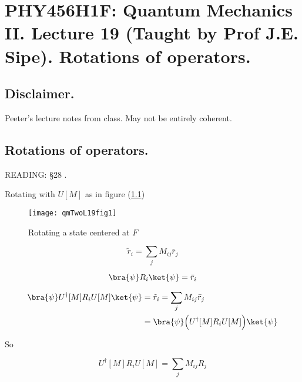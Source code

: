 
%

\chapter{PHY456H1F: Quantum Mechanics II.  Lecture 19 (Taught by Prof J.E. Sipe).  Rotations of operators.}
\label{chap:qmTwoL19}
{}
\date{Nov 16, 2011}

\beginArtWithToc

\section{Disclaimer.}

Peeter's lecture notes from class.  May not be entirely coherent.

\section{Rotations of operators.}

READING: \S 28 \cite{desai2009quantum}.

Rotating with $U[M]$ as in figure (\ref{fig:qmTwoL19:qmTwoL19fig1})
\begin{figure}[htp]
   \centering
   \texttt{[image: qmTwoL19fig1]}
   \caption{Rotating a state centered at $F$}\label{fig:qmTwoL19:qmTwoL19fig1}
\end{figure}

\begin{equation}\label{eqn:qmTwoL19:10}
\tilde{r}_i = \sum_j M_{ij} \bar{r}_j
\end{equation}

\begin{equation}\label{eqn:qmTwoL19:30}
\bra{\psi} R_i \ket{\psi} = \bar{r}_i
\end{equation}

\begin{align*}
\bra{\psi} U^\dagger[M] R_i U[M] \ket{\psi}
&= \tilde{r}_i = \sum_j M_{ij} \bar{r}_j \\
&=
\bra{\psi} \Bigl( U^\dagger[M] R_i U[M] \Bigr) \ket{\psi}
\end{align*}

So

\begin{equation}\label{eqn:qmTwoL19:50}
U^\dagger[M] R_i U[M] = \sum_j M_{ij} R_j
\end{equation}

